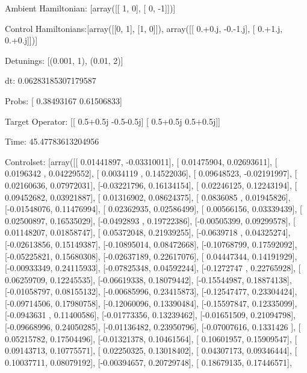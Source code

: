 \documentclass{article}
\begin{document}
    

\newpage

Ambient Hamiltonian: [array([[ 1,  0],
       [ 0, -1]])]

Control Hamiltonians:[array([[0, 1],
       [1, 0]]), array([[ 0.+0.j, -0.-1.j],
       [ 0.+1.j,  0.+0.j]])]

Detunings: [(0.001, 1), (0.01, 2)]

 dt: 0.06283185307179587

Probs: [ 0.38493167  0.61506833]

Target Operator: [[ 0.5+0.5j -0.5-0.5j]
 [ 0.5+0.5j  0.5+0.5j]]

Time: 45.47783613204956

Controlset: [array([[ 0.01441897, -0.03310011],
       [ 0.01475904,  0.02693611],
       [ 0.0196342 ,  0.04229552],
       [ 0.0034119 ,  0.14522036],
       [ 0.09648523, -0.02191997],
       [ 0.02160636,  0.07972031],
       [-0.03221796,  0.16134154],
       [ 0.02246125,  0.12243194],
       [ 0.09452682,  0.03921887],
       [ 0.01316902,  0.08624375],
       [ 0.0836085 ,  0.01945826],
       [-0.01548076,  0.11476994],
       [ 0.02362935,  0.02586499],
       [ 0.00566156,  0.03339439],
       [ 0.02500897,  0.16535029],
       [-0.0492893 ,  0.19722386],
       [-0.00505399,  0.09299578],
       [ 0.01148207,  0.01858747],
       [ 0.05372048,  0.21939255],
       [-0.0639718 ,  0.04325274],
       [-0.02613856,  0.15149387],
       [-0.10895014,  0.08472668],
       [-0.10768799,  0.17592092],
       [-0.05225821,  0.15680308],
       [-0.02637189,  0.22617076],
       [ 0.04447344,  0.14191929],
       [-0.00933349,  0.24115933],
       [-0.07825348,  0.04592244],
       [-0.1272747 ,  0.22765928],
       [ 0.06259709,  0.12245535],
       [-0.06619338,  0.18079442],
       [-0.15544987,  0.18874138],
       [-0.01058797,  0.08155132],
       [-0.00685996,  0.23415873],
       [-0.12547477,  0.23304424],
       [-0.09714506,  0.17980758],
       [-0.12060096,  0.13390484],
       [-0.15597847,  0.12335099],
       [-0.0943631 ,  0.11400586],
       [-0.01773356,  0.13239462],
       [-0.01651509,  0.21094798],
       [-0.09668996,  0.24050285],
       [-0.01136482,  0.23950796],
       [-0.07007616,  0.1331426 ],
       [ 0.05215782,  0.17504496],
       [-0.01321378,  0.10461564],
       [ 0.10601957,  0.15909547],
       [ 0.09143713,  0.10775571],
       [ 0.02250325,  0.13018402],
       [ 0.04307173,  0.09346444],
       [ 0.10037711,  0.08079192],
       [-0.00394657,  0.20729748],
       [ 0.18679135,  0.17446571],
\end{document}
